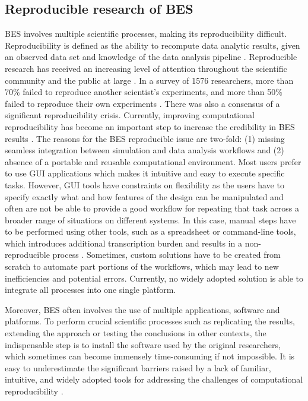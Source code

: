 \documentclass[3p, times]{elsarticle} %
\begin{document}
\hypertarget{reproducible-research-of-bes}{%
\subsection{Reproducible research of BES}\label{reproducible-research-of-bes}}

BES involves multiple scientific processes, making its reproducibility difficult.
Reproducibility is defined as the ability to recompute data analytic results,
given an observed data set and knowledge of the data analysis pipeline
\citep{Peng2015}.
Reproducible research has received an increasing level of attention throughout
the scientific community and the public at large \citep{Boettiger2015}.
In a survey of 1576 researchers,
more than 70\% failed to reproduce another scientist's experiments, and
more than 50\% failed to reproduce their own experiments \citep{Baker2016a}.
There was also a consensus of a significant reproducibility crisis.
Currently, improving computational reproducibility has become an important
step to increase the credibility in BES results \citep{Fleming2012}.
The reasons for the BES reproducible issue are two-fold:
(1) missing seamless integration between simulation and data analysis workflows and
(2) absence of a portable and reusable computational environment.
Most users prefer to use GUI applications which makes it intuitive and easy to
execute specific tasks.
However, GUI tools have constraints on flexibility as the users have to specify
exactly what and how features of the design can be manipulated and often are
not be able to provide a good workflow for repeating that task across a broader
range of situations on different systems.
In this case, manual steps have to be performed using other tools, such as a
spreadsheet or command-line tools, which introduces additional transcription
burden and results in a non-reproducible process \citep{Macumber2012}.
Sometimes, custom solutions have to be created from scratch to automate part
portions of the workflows, which may lead to new inefficiencies and potential
errors. Currently, no widely adopted solution is able to
integrate all processes into one single platform.

Moreover, BES often involves the use of multiple applications, software and
platforms.
To perform crucial scientific processes such as replicating the results,
extending the approach or testing the conclusions in other contexts, the
indispensable step is to install the software used by the original researchers,
which sometimes can become immensely time-consuming if not impossible.
It is easy to underestimate the significant barriers raised by a lack of
familiar, intuitive, and widely adopted tools for addressing the challenges of
computational reproducibility \citep{Boettiger2015}.
\end{document}
